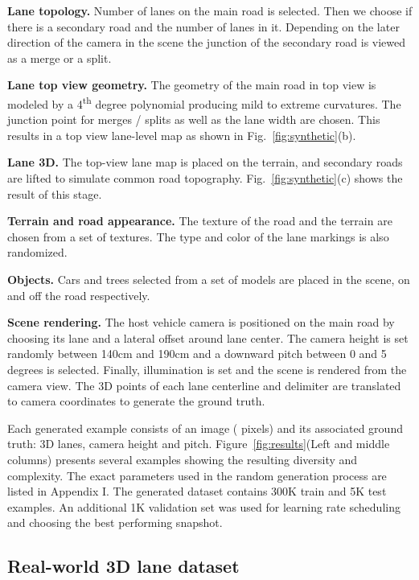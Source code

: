 \documentclass[10pt,twocolumn,letterpaper]{article}
\begin{document}
\textbf{Lane topology.} Number of lanes on the main road is selected. Then we choose if there is a secondary road and the number of lanes in it. Depending on the later direction of the camera in the scene the junction of the secondary road is viewed as a merge or a split.

\textbf{Lane top view geometry.} The geometry of the main road in top view is modeled by a 4\textsuperscript{th} degree polynomial producing mild to extreme curvatures. The junction point for merges / splits as well as the lane width are chosen. This results in a top view lane-level map as shown in Fig.~\ref{fig:synthetic}(b).

\textbf{Lane 3D.} The top-view lane map is placed on the terrain, and secondary roads are lifted to simulate common road topography. Fig.~\ref{fig:synthetic}(c) shows the result of this stage.

\textbf{Terrain and road appearance.} The texture of the road and the terrain are chosen from a set of textures. The type and color of the lane markings is also randomized.


\textbf{Objects.} Cars and trees selected from a set of models are placed in the scene, on and off the road respectively.


\textbf{Scene rendering.} The host vehicle camera is positioned on the main road by choosing its lane and a lateral offset around lane center. The camera height is set randomly between 140cm and 190cm and a downward pitch between 0 and 5 degrees is selected. Finally, illumination is set and the scene is rendered from the camera view. The 3D points of each lane centerline and delimiter are translated to camera coordinates to generate the ground truth.  

Each generated example consists of an image ( pixels) and its associated ground truth: 3D lanes, camera height and pitch. Figure~\ref{fig:results}(Left and middle columns) presents several examples showing the resulting diversity and complexity. The exact parameters used in the random generation process are listed in Appendix I. The generated dataset contains 300K train and 5K test examples. An additional 1K validation set was used for learning rate scheduling and choosing the best performing snapshot.


\subsection{Real-world 3D lane dataset}
\end{document}
